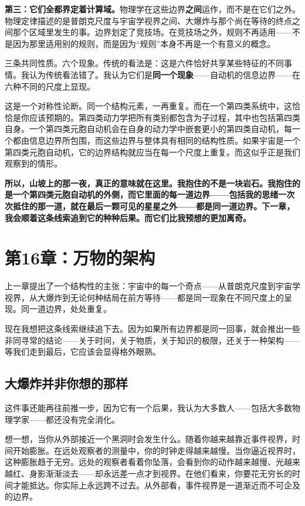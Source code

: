 \documentclass[11pt, twoside, openright]{book}
\begin{document}
\textbf{第三：它们全都界定着计算域。}物理学在这些边界\textbf{之间}运作，而不是在它们之外。物理定律描述的是普朗克尺度与宇宙学视界之间、大爆炸与那个尚在等待的终点之间那个区域里发生的事。边界划定了竞技场。在竞技场之外，规则不再适用------不是因为那里适用别的规则，而是因为“规则”本身不再是一个有意义的概念。

三条共同性质。六个现象。传统的看法是：这是六件恰好共享某些特征的不同事情。我认为传统看法错了。我认为它们是\textbf{同一个现象}------自动机的信息边界------在六种不同的尺度上显现。

这是一个对称性论断。同一个结构元素，一再重复。而在一个第四类系统中，这恰恰是你应该预期的。第四类动力学把所有类别都包含为子过程，其中也包括第四类自身。一个第四类元胞自动机会在自身的动力学中嵌套更小的第四类自动机，每一个都由信息边界所包围，而这些边界与整体具有相同的结构性质。如果宇宙是一个第四类元胞自动机，它的边界结构就应当在每一个尺度上重复。而这似乎正是我们观察到的情形。


\textbf{所以，山坡上的那一夜，真正的意味就在这里。我抱住的不是一块岩石。我抱住的是一个第四类元胞自动机的外侧，而它里面的每一道边界------包括我的思绪一次次抵住的那一道，就在最后一颗可见的星星之外------都是同一道边界。下一章，我会顺着这条线索追到它的种种后果。而它们比我预想的更加离奇。}


\chapter*{第16章：万物的架构}

上一章提出了一个结构性的主张：宇宙中的每一个奇点------从普朗克尺度到宇宙学视界，从大爆炸到无论何种结局在前方等待------都是同一现象在不同尺度上的呈现。同一道边界，处处重复。

现在我想把这条线索继续追下去。因为如果所有边界都是同一回事，就会推出一些非同寻常的结论------关于时间，关于物质，关于知识的极限，还关于一种架构------等我们走到最后，它应该会显得格外眼熟。


\section*{大爆炸并非你想的那样}

这件事还能再往前推一步，因为它有一个后果，我认为大多数人------包括大多数物理学家------都还没有完全消化。

想一想，当你从外部接近一个黑洞时会发生什么。随着你越来越靠近事件视界，时间开始膨胀。在远处观察者的测量中，你的时钟走得越来越慢。当你逼近视界时，这种膨胀趋于无穷。远处的观察者看着你坠落，会看到你的动作越来越慢、光越来越红、身影渐渐淡去------却永远差一点才到视界。在他们看来，你要花无穷长的时间才能抵达。你实际上永远跨不过去。从外部看，事件视界是一道渐近而不可企及的边界。
\end{document}
